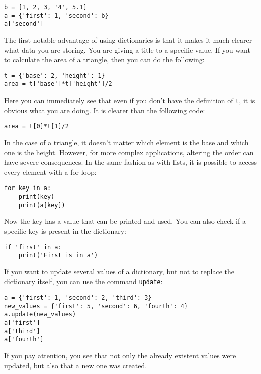 \begin{verbatim}
b = [1, 2, 3, '4', 5.1]
a = {'first': 1, 'second': b}
a['second']
\end{verbatim}

The first notable advantage of using dictionaries is that it makes it much clearer what data you are storing. You are giving a title to a specific value. If you want to calculate the area of a triangle, then you can do the following:

\begin{verbatim}
t = {'base': 2, 'height': 1}
area = t['base']*t['height']/2
\end{verbatim}

Here you can immediately see that even if you don't have the definition of \texttt{t}, it is obvious what you are doing. It is clearer than the following code:

\begin{verbatim}
area = t[0]*t[1]/2
\end{verbatim}

In the case of a triangle, it doesn't matter which element is the base and which one is the height. However, for more complex applications, altering the order can have severe consequences. In the same fashion as with lists, it is possible to access every element with a for loop:

\begin{verbatim}
for key in a:
    print(key)
    print(a[key])
\end{verbatim}

Now the key has a value that can be printed and used. You can also check if a specific key is present in the dictionary:

\begin{verbatim}
if 'first' in a:
    print('First is in a')
\end{verbatim}

If you want to update several values of a dictionary, but not to replace the dictionary itself, you can use the command \texttt{update}:

\begin{verbatim}
a = {'first': 1, 'second': 2, 'third': 3}
new_values = {'first': 5, 'second': 6, 'fourth': 4}
a.update(new_values)
a['first']
a['third']
a['fourth']
\end{verbatim}

If you pay attention, you see that not only the already existent values were updated, but also that a new one was created.

